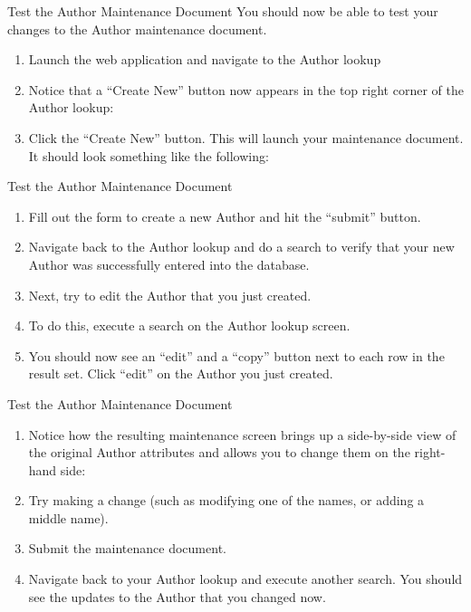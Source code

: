 \documentclass[xcolor=dvipsnames,14pt,professionalfonts]{beamer}
\begin{document}
\begin{frame}{Test the Author Maintenance Document}
  You should now be able to test your changes to the Author maintenance document.
  \begin{enumerate}
    \item Launch the web application and navigate to the Author lookup
    \item Notice that a “Create New” button now appears in the top right corner of the Author lookup:
    \item Click the “Create New” button.  This will launch your maintenance document.  It should look something like the following:
  \end{enumerate}
\end{frame}

\begin{frame}{Test the Author Maintenance Document}
  \begin{enumerate}
  \item Fill out the form to create a new Author and hit the “submit” button.
  \item Navigate back to the Author lookup and do a search to verify that your new Author was successfully entered into the database.
  \item Next, try to edit the Author that you just created.
  \item To do this, execute a search on the Author lookup screen.
  \item You should now see an “edit” and a “copy” button next to each row in the result set.  Click “edit” on the Author you just created.
  \end{enumerate}
\end{frame}

\begin{frame}{Test the Author Maintenance Document}
  \begin{enumerate}
  \item Notice how the resulting maintenance screen brings up a side-by-side view of the original Author attributes and allows you to change them on the right-hand side:
  \item Try making a change (such as modifying one of the names, or adding a middle name).
  \item Submit the maintenance document.
  \item Navigate back to your Author lookup and execute another search.  You should see the updates to the Author that you changed now.
  \end{enumerate}
\end{frame}
\end{document}
